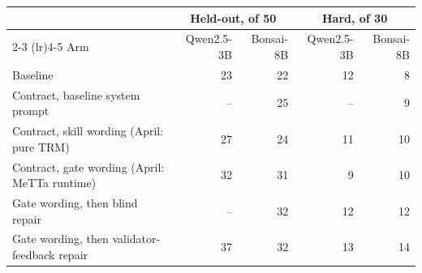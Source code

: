 \begin{tabular}{lrrrr}
\toprule
 & \multicolumn{2}{c}{Held-out, of 50} & \multicolumn{2}{c}{Hard, of 30} \\
\cmidrule(lr){2-3} \cmidrule(lr){4-5}
Arm & Qwen2.5-3B & Bonsai-8B & Qwen2.5-3B & Bonsai-8B \\
\midrule
Baseline & 23 & 22 & 12 & 8 \\
Contract, baseline system prompt & -- & 25 & -- & 9 \\
Contract, skill wording (April: pure TRM) & 27 & 24 & 11 & 10 \\
Contract, gate wording (April: MeTTa runtime) & 32 & 31 & 9 & 10 \\
Gate wording, then blind repair & -- & 32 & 12 & 12 \\
Gate wording, then validator-feedback repair & 37 & 32 & 13 & 14 \\
\bottomrule
\end{tabular}
